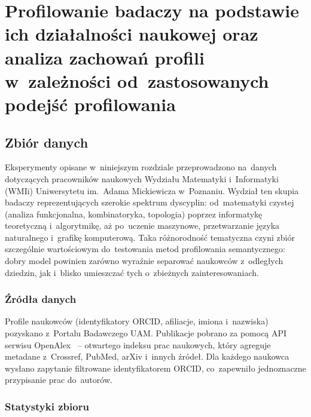 
\chapter{Profilowanie badaczy na podstawie ich działalności naukowej
         oraz analiza zachowań profili w~zależności od~zastosowanych
         podejść profilowania}

\section{Zbiór danych}
\label{sec:dataset}

Eksperymenty opisane w~niniejszym rozdziale przeprowadzono na~danych
dotyczących pracowników naukowych Wydziału Matematyki i~Informatyki
(WMIi) Uniwersytetu im.~Adama Mickiewicza w~Poznaniu.
Wydział ten skupia badaczy reprezentujących szerokie spektrum
dyscyplin: od~matematyki czystej (analiza funkcjonalna, kombinatoryka,
topologia) poprzez informatykę teoretyczną i~algorytmikę,
aż po~uczenie maszynowe, przetwarzanie języka naturalnego
i~grafikę komputerową.
Taka różnorodność tematyczna czyni zbiór szczególnie wartościowym
do~testowania metod profilowania semantycznego: dobry model powinien
zarówno wyraźnie separować naukowców z~odległych dziedzin,
jak i~blisko umieszczać tych o~zbieżnych zainteresowaniach.

\subsection{Źródła danych}

Profile naukowców (identyfikatory ORCID, afiliacje, imiona i~nazwiska)
pozyskano z~Portalu Badawczego UAM.
Publikacje pobrano za pomocą API serwisu OpenAlex~\cite{priem2022openalex} --
otwartego indeksu prac naukowych, który agreguje metadane
z~Crossref, PubMed, arXiv i~innych źródeł.
Dla każdego naukowca wysłano zapytanie filtrowane identyfikatorem
ORCID, co~zapewniło jednoznaczne przypisanie prac do~autorów.

\subsection{Statystyki zbioru}

